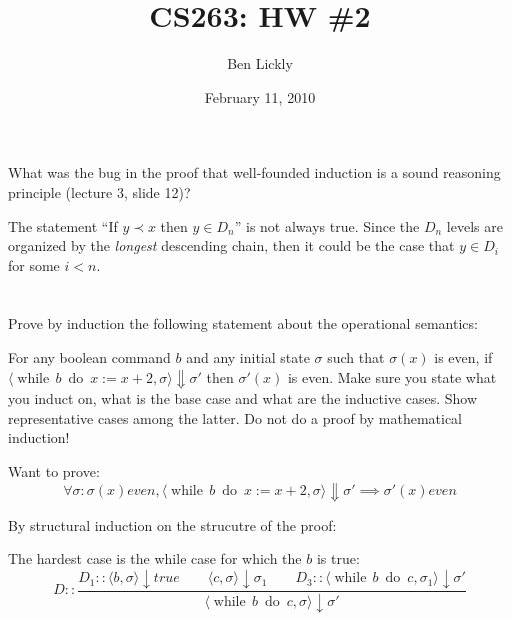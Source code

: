 \documentclass{article}
\title{CS263: HW \#2}
\author{Ben Lickly}
\date{February 11, 2010}
\newcommand{\problem}[1]
{\subsubsection*{} %
\vspace{-16pt} \section{} \vspace{-22pt} \qquad
#1%
\bigskip \bigskip
}
\begin{document}
\maketitle
\problem{
What was the bug in the proof that well-founded induction is a sound
reasoning principle (lecture 3, slide 12)?
}

  The statement ``If $y \prec x$ then $y \in D_n$'' is not always true. Since the
  $D_n$ levels are organized by the \emph{longest} descending chain, then it
  could be the case that $y \in D_i$ for some $i < n$.
  
\problem{
Prove by induction the following statement about the operational semantics:

\newcommand{\while}[2]{\operatorname{while}\, #1\ \operatorname{do}\ #2}

For any boolean command $b$ and any initial state $\sigma$ such that $\sigma(x)$
is even, if $\langle \while{b}{x := x + 2}, \sigma \rangle \Downarrow \sigma'$
then $\sigma'(x)$ is even. Make sure you state what you induct on, what is the
base case and what are the inductive cases. Show representative cases among
the latter. Do not do a proof by mathematical induction!
}

Want to prove:
\[
\forall \sigma : \sigma(x) even, \langle \while{b}{x := x + 2}, \sigma
\rangle \Downarrow \sigma' \implies \sigma'(x) even
\]

By structural induction on the strucutre of the proof:

The hardest case is the while case for which the $b$ is true:
\[
D :: \frac{
D_1 :: \langle b, \sigma \rangle \downarrow true
\qquad
\langle c, \sigma \rangle \downarrow \sigma_1
\qquad
D_3 :: \langle \while{b}{c}, \sigma_1 \rangle \downarrow \sigma'
}{
\langle \while{b}{c}, \sigma \rangle \downarrow \sigma'
}
\]
\end{document}
